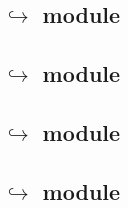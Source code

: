 \subsection{\systTxnDataMod{} $\hookrightarrow$ \wcpMod{} module}               \label{system transactions: lookups: wcp}                            
\subsection{\systTxnDataMod{} $\hookrightarrow$ \eucMod{} module}               \label{system transactions: lookups: euc}                            
\subsection{\systTxnDataMod{} $\hookrightarrow$ \btcMod{} module}               \label{system transactions: lookups: block data}                     
\subsection{\systTxnDataMod{} $\hookrightarrow$ \hubMod{} module}               \label{system transactions: lookups: hub}                            
